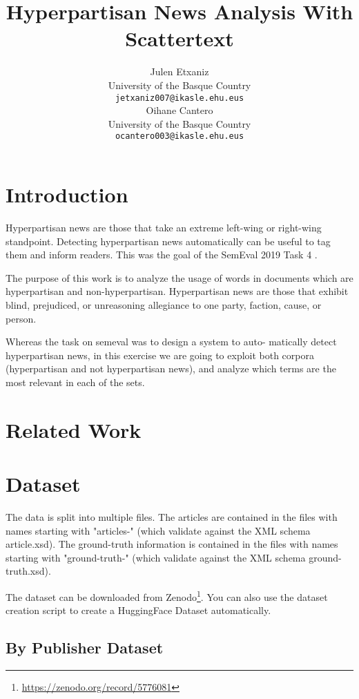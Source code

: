 \documentclass[11pt,a4paper]{article}
\title{Hyperpartisan News Analysis With Scattertext}
\author{Julen Etxaniz \\
  University of the Basque Country \\
  \texttt{jetxaniz007@ikasle.ehu.eus} \\\And
  Oihane Cantero \\
  University of the Basque Country \\
  \texttt{ocantero003@ikasle.ehu.eus} \\}
\date{}
\begin{document}
\maketitle
\begin{abstract}

\end{abstract}

\section{Introduction}

Hyperpartisan news are those that take an extreme left-wing or right-wing standpoint. Detecting hyperpartisan news automatically can be useful to tag them and inform readers. This was the goal of the SemEval 2019 Task 4 \cite{kiesel2019semeval}.

The purpose of this work is to analyze the usage of words in documents which are hyperpartisan and non-hyperpartisan. Hyperpartisan news are those that exhibit blind, prejudiced, or unreasoning allegiance to one party, faction, cause, or person.

Whereas the task on semeval was to design a system to auto- matically detect hyperpartisan news, in this exercise we are going to exploit both corpora (hyperpartisan and not hyperpartisan news), and analyze which terms are the most relevant in each of the sets.

\section{Related Work}

\section{Dataset}

The data is split into multiple files. The articles are contained in the files with names starting with "articles-" (which validate against the XML schema article.xsd). The ground-truth information is contained in the files with names starting with "ground-truth-" (which validate against the XML schema ground-truth.xsd).

The dataset can be downloaded from Zenodo\footnote{\url{https://zenodo.org/record/5776081}}. You can also use the dataset creation script to create a HuggingFace Dataset automatically.

\subsection{By Publisher Dataset}
\end{document}
